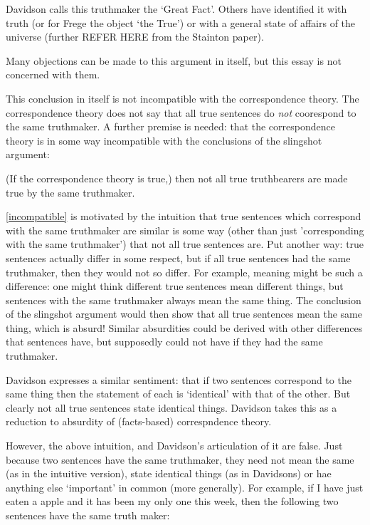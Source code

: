 Davidson calls this truthmaker the `Great Fact'.
\parencite[753]{Davidson_1969} 
Others have identified it with truth (or for Frege the object `the True'\parencite[216]{Frege_1948}) or with a general state of affairs of the universe (further REFER HERE from the Stainton paper).

Many objections can be made to this argument in itself, but this essay is not concerned with them.

This conclusion in itself is not incompatible with the correspondence theory.
The correspondence theory does not say that all true sentences do \emph{not} coorespond to the same truthmaker.
A further premise is needed: that the correspondence theory is in some way incompatible with the conclusions of the slingshot argument:

	\begin{thesis} \label{incompatible}
	(If the correspondence theory is true,) then not all true truthbearers are made true by the same truthmaker.
	\end{thesis}

\ref{incompatible} is motivated by the intuition that true sentences which correspond with the same truthmaker are similar is some way (other than just 'corresponding with the same truthmaker') that not all true sentences are.
Put another way: true sentences actually differ in some respect, but if all true sentences had the same truthmaker, then they would not so differ.
For example, meaning might be such a difference: one might think different true sentences mean different things, but sentences with the same truthmaker always mean the same thing.
The conclusion of the slingshot argument would then show that all true sentences mean the same thing, which is absurd!
Similar absurdities could be derived with other differences that sentences have, but supposedly could not have if they had the same truthmaker.

Davidson expresses a similar sentiment: that if two sentences correspond to the same thing then the statement of each is `identical' with that of the other.
But clearly not all true sentences state identical things.
Davidson takes this as a reduction to absurdity of (facts-based) correspndence theory. %
\parencite[750]{Davidson_1969}

However, the above intuition, and Davidson's articulation of it are false.
Just because two sentences have the same truthmaker, they need not mean the same (as in the intuitive version), state identical things (as in Davidsons) or hae anything else `important' in common (more generally).
For example, if I have just eaten a apple and it has been my only one this week, then the following two sentences have the same truth maker:

